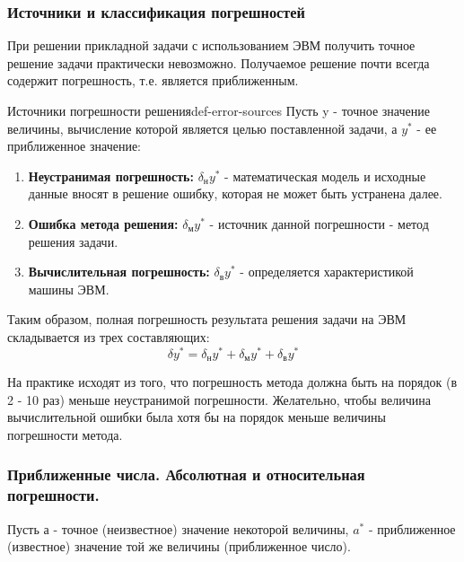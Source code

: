\documentclass[14pt]{extarticle}
\begin{document}
    \subsubsection{Источники и классификация погрешностей}

        При решении прикладной задачи с использованием ЭВМ получить точное решение задачи практически невозможно. Получаемое решение почти всегда содержит погрешность, т.е. является приближенным. 
        \begin{definition}{Источники погрешности решения}{def-error-sources}
            Пусть y - точное значение величины, вычисление которой является целью поставленной задачи, а $y^{*}$ - ее приближенное значение:
            
            \begin{enumerate}
                \item \textbf{Неустранимая погрешность:} $\delta_{\text{н}}y^{*}$ - математическая модель и исходные данные вносят в решение ошибку, которая не может быть устранена далее.
                \item \textbf{Ошибка метода решения:} $\delta_{\text{м}}y^{*}$ - источник данной погрешности - метод решения задачи.
                \item \textbf{Вычислительная погрешность:} $\delta_{\text{в}}y^{*}$ - определяется характеристикой машины ЭВМ.
            \end{enumerate}
        \end{definition}

        Таким образом, полная погрешность результата решения задачи на ЭВМ складывается из трех составляющих:
        $$\delta y^{*} = \delta_{\text{н}}y^{*} + \delta_{\text{м}}y^{*} + \delta_{\text{в}}y^{*}$$

        \vspace{\baselineskip}

        На практике исходят из того, что погрешность метода должна быть на порядок (в 2 - 10 раз) меньше неустранимой погрешности. Желательно, чтобы величина вычислительной ошибки была хотя бы на порядок меньше величины погрешности метода.

    \subsubsection{Приближенные числа. Абсолютная и относительная погрешности.}
        
        Пусть $а$ - точное (неизвестное) значение некоторой величины, $a^{*}$ - приближенное (известное) значение той же величины (приближенное число).
\end{document}
